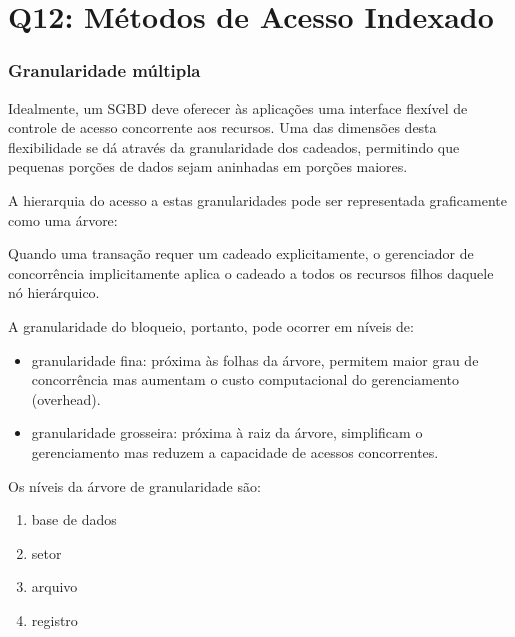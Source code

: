 \documentclass{beamer}
\begin{document}
\section{Q12: Métodos de Acesso Indexado}


\begin{frame}
    \frametitle{Granularidade múltipla}
    
    Idealmente, um SGBD deve oferecer às aplicações uma interface flexível de controle de acesso concorrente aos recursos. Uma das dimensões desta flexibilidade se dá através da granularidade dos cadeados, permitindo que pequenas porções de dados sejam aninhadas em porções maiores.
    
    A hierarquia do acesso a estas granularidades pode ser representada graficamente como uma árvore:
    
    
\end{frame}
    
    
\begin{frame}
    
    Quando uma transação requer um cadeado explicitamente, o gerenciador de concorrência implicitamente aplica o cadeado a todos os recursos filhos daquele nó hierárquico.
    
    A granularidade do bloqueio, portanto, pode ocorrer em níveis de:
    
    \begin{itemize}
        \item granularidade fina: próxima às folhas da árvore, permitem maior grau de concorrência mas aumentam o custo computacional do gerenciamento (overhead).
        \item granularidade grosseira: próxima à raiz da árvore, simplificam o gerenciamento mas reduzem a capacidade de acessos concorrentes.
    \end{itemize}
    
    Os níveis da árvore de granularidade são:
    
    \begin{enumerate}
        \item base de dados
        \item setor
        \item arquivo
        \item registro
    \end{enumerate}
    
\end{frame}
    
\end{document}
